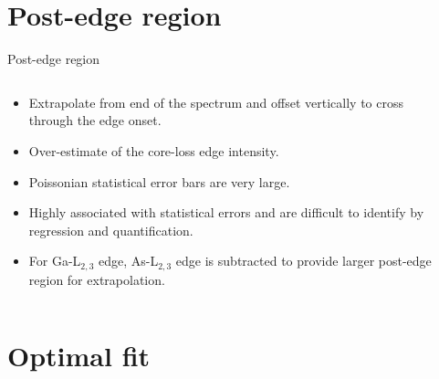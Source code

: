 \documentclass[aspectratio=169]{beamer}
\begin{document}
\section{Post-edge region}

\begin{frame}{Post-edge region}

\begin{columns}[t]
	\begin{column}{.6\textwidth}
		\begin{itemize}
			\item Extrapolate from end of the spectrum and offset vertically to cross through the edge onset.
			\item Over-estimate of the core-loss edge intensity.
			\item Poissonian statistical error bars are very large.
			\item Highly associated with statistical errors and are difficult to identify by regression and quantification.
			\item For Ga-L$_{2,3}$ edge, As-L$_{2,3}$ edge is subtracted to provide larger post-edge region for extrapolation.
		\end{itemize}
	\end{column}

	\begin{column}{.4\textwidth}
	\end{column}
\end{columns}

\end{frame}


\section{Optimal fit}
\end{document}
